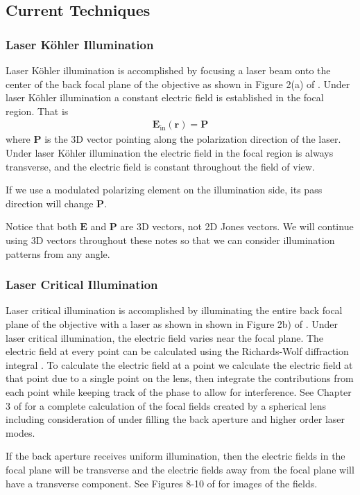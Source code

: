 \documentclass[11pt]{article}
\providecommand{\mb}[1]{\mathbf{#1}}
\begin{document}
\subsection{Current Techniques}
\subsubsection{Laser K\"{o}hler Illumination}
Laser K\"{o}hler illumination is accomplished by focusing a laser beam onto the
center of the back focal plane of the objective as shown in Figure 2(a) of
\cite{backlund}. Under laser K\"{o}hler illumination a constant electric field
is established in the focal region. That is
\begin{align*}
  \mb{E}_{\text{in}}(\mb{r}) = \mb{P}
\end{align*}
where $\mb{P}$ is the 3D vector pointing along the polarization direction of the
laser. Under laser K\"{o}hler illumination the electric field in the focal
region is always transverse, and the electric field is constant throughout the
field of view.

If we use a modulated polarizing element on the illumination side, its pass
direction will change $\mb{P}$.

Notice that both $\mb{E}$ and $\mb{P}$ are 3D vectors, not 2D Jones vectors. We
will continue using 3D vectors throughout these notes so that we can consider
illumination patterns from any angle.

\subsubsection{Laser Critical Illumination}
Laser critical illumination is accomplished by illuminating the entire back
focal plane of the objective with a laser as shown in shown in Figure 2b) of
\cite{backlund}. Under laser critical illumination, the electric field varies
near the focal plane. The electric field at every point can be calculated using
the Richards-Wolf diffraction integral \cite{richards}. To calculate the
electric field at a point we calculate the electric field at that point due to a
single point on the lens, then integrate the contributions from each point while
keeping track of the phase to allow for interference. See Chapter 3 of
\cite{nov} for a complete calculation of the focal fields created by a spherical
lens including consideration of under filling the back aperture and higher order
laser modes.

If the back aperture receives uniform illumination, then the electric fields in
the focal plane will be transverse and the electric fields away from the focal
plane will have a transverse component. See Figures 8-10 of \cite{youngworth} for
images of the fields.
\end{document}
